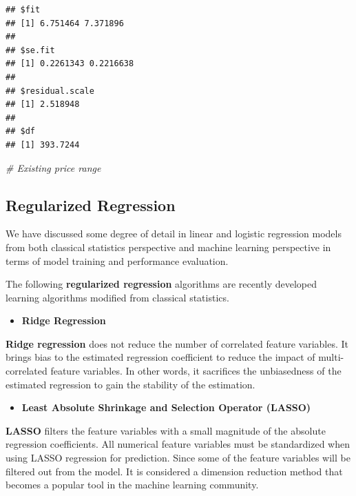 \documentclass[
]{book}
\newenvironment{Shaded}{\begin{snugshade}}{\end{snugshade}}
\newcommand{\CommentTok}[1]{\textcolor[rgb]{0.56,0.35,0.01}{\textit{#1}}}
\providecommand{\tightlist}{%
  \setlength{\itemsep}{0pt}\setlength{\parskip}{0pt}}
\begin{document}
\begin{verbatim}
## $fit
## [1] 6.751464 7.371896
## 
## $se.fit
## [1] 0.2261343 0.2216638
## 
## $residual.scale
## [1] 2.518948
## 
## $df
## [1] 393.7244
\end{verbatim}

\begin{Shaded}
\begin{Highlighting}[]
                                                       \CommentTok{\# Existing price range}
\end{Highlighting}
\end{Shaded}

\hypertarget{regularized-regression}{%
\subsection{Regularized Regression}\label{regularized-regression}}

We have discussed some degree of detail in linear and logistic regression models from both classical statistics perspective and machine learning perspective in terms of model training and performance evaluation.

The following \textbf{regularized regression} algorithms are recently developed learning algorithms modified from classical statistics.

\begin{itemize}
\tightlist
\item
  \textbf{Ridge Regression}
\end{itemize}

\textbf{Ridge regression} does not reduce the number of correlated feature variables. It brings bias to the estimated regression coefficient to reduce the impact of multi-correlated feature variables. In other words, it sacrifices the unbiasedness of the estimated regression to gain the stability of the estimation.

\begin{itemize}
\tightlist
\item
  \textbf{Least Absolute Shrinkage and Selection Operator (LASSO)}
\end{itemize}

\textbf{LASSO} filters the feature variables with a small magnitude of the absolute regression coefficients. All numerical feature variables must be standardized when using LASSO regression for prediction. Since some of the feature variables will be filtered out from the model. It is considered a dimension reduction method that becomes a popular tool in the machine learning community.
\end{document}
